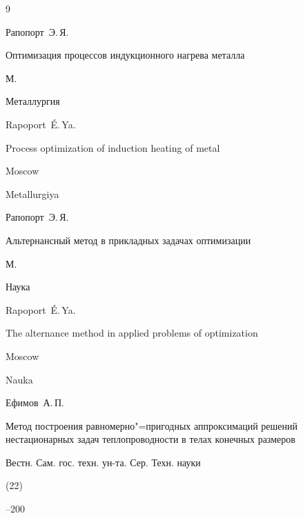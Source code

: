 \begin{thebibliography}{9}




\by Рапопорт~Э.\,Я.

\book Оптимизация процессов индукционного нагрева металла

\publaddr М.

\publ Металлургия



\misctransl

\by Rapoport~\'E.\,Ya.

\book Process optimization of induction heating of metal

\publaddr Moscow

\publ Metallurgiya






\by Рапопорт~Э.\,Я. 

\book Альтернансный метод в прикладных задачах оптимизации

\publaddr М.

\publ Наука



\misctransl

\by Rapoport~\'E.\,Ya.

\book The alternance method in applied problems of optimization

\publaddr Moscow

\publ Nauka








\by Ефимов~А.\,П.

\paper Метод построения равномерно"=пригодных аппроксимаций решений нестационарных задач теплопроводности в телах конечных размеров

\jour Вестн. Сам. гос. техн. ун-та. Сер. Техн. науки

(22)


--200

\misctransl 


\end{thebibliography}
